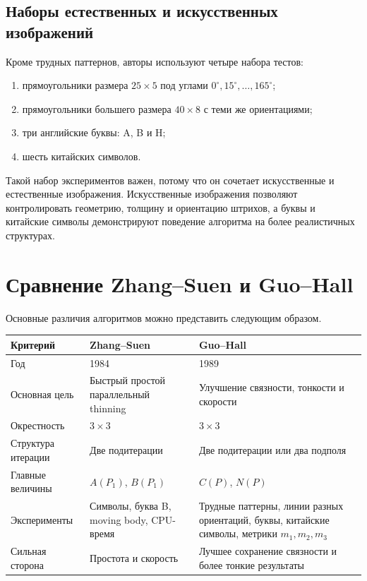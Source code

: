 \documentclass[12pt,a4paper]{article}
\begin{document}
\subsection{Наборы естественных и искусственных изображений}

Кроме трудных паттернов, авторы используют четыре набора тестов:

\begin{enumerate}
    \item прямоугольники размера $25\times5$ под углами $0^\circ,15^\circ,\ldots,165^\circ$;
    \item прямоугольники большего размера $40\times8$ с теми же ориентациями;
    \item три английские буквы: A, B и H;
    \item шесть китайских символов.
\end{enumerate}

Такой набор экспериментов важен, потому что он сочетает искусственные и естественные изображения. Искусственные изображения позволяют контролировать геометрию, толщину и ориентацию штрихов, а буквы и китайские символы демонстрируют поведение алгоритма на более реалистичных структурах.

\section{Сравнение Zhang--Suen и Guo--Hall}

Основные различия алгоритмов можно представить следующим образом.

\begin{center}
\begin{tabular}{p{45mm}p{45mm}p{45mm}}
\toprule
Критерий & Zhang--Suen & Guo--Hall \\
\midrule
Год & 1984 & 1989 \\
Основная цель & Быстрый простой параллельный thinning & Улучшение связности, тонкости и скорости \\
Окрестность & $3\times3$ & $3\times3$ \\
Структура итерации & Две подитерации & Две подитерации или два подполя \\
Главные величины & $A(P_1)$, $B(P_1)$ & $C(P)$, $N(P)$ \\
Эксперименты & Символы, буква B, moving body, CPU-время & Трудные паттерны, линии разных ориентаций, буквы, китайские символы, метрики $m_1,m_2,m_3$ \\
Сильная сторона & Простота и скорость & Лучшее сохранение связности и более тонкие результаты \\
\bottomrule
\end{tabular}
\end{center}
\end{document}

